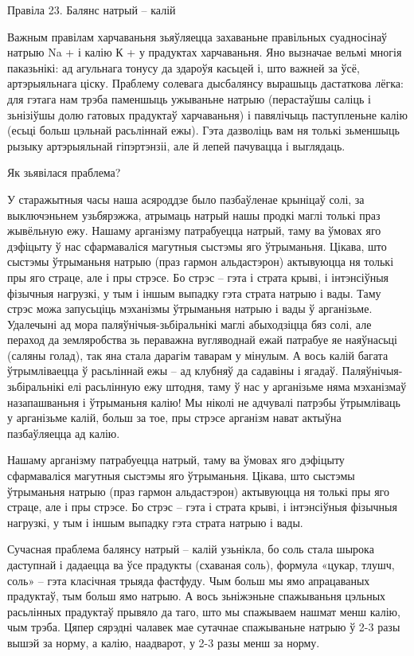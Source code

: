 Правіла 23. Балянс натрый – калій

Важным правілам харчаваньня зьяўляецца захаваньне правільных суадносінаў натрыю Na + і калію К + у прадуктах харчаваньня. Яно вызначае вельмі многія паказьнікі: ад агульнага тонусу да здароўя касьцей і, што важней за ўсё, артэрыяльнага ціску.
Праблему солевага дысбалянсу вырашыць дастаткова лёгка: для гэтага нам трэба паменшыць ужываньне натрыю (перастаўшы саліць і зьнізіўшы долю гатовых прадуктаў харчаваньня) і павялічыць паступленьне калію (есьці больш цэльнай расьліннай ежы). Гэта дазволіць вам ня толькі зьменшыць рызыку артэрыяльнай гіпэртэнзіі, але й лепей пачувацца і выглядаць.

Як зьявілася праблема?

У старажытныя часы наша асяроддзе было пазбаўленае крыніцаў солі, за выключэньнем узьбярэжжа, атрымаць натрый нашы продкі маглі толькі праз жывёльную ежу. Нашаму арганізму патрабуецца натрый, таму ва ўмовах яго дэфіцыту ў нас сфармаваліся магутныя сыстэмы яго ўтрыманьня. Цікава, што сыстэмы ўтрыманьня натрыю (праз гармон альдастэрон) актывуюцца ня толькі пры яго страце, але і пры стрэсе. Бо стрэс – гэта і страта крыві, і інтэнсіўныя фізычныя нагрузкі, у тым і іншым выпадку  гэта страта натрыю і вады. Таму стрэс можа запусьціць мэханізмы ўтрыманьня натрыю і вады ў арганізьме. Удалечыні ад мора паляўнічыя-зьбіральнікі маглі абыходзіцца бяз солі, але пераход да земляробства зь пераважна вугляводнай ежай патрабуе яе наяўнасьці (саляны голад), так яна стала дарагім таварам у мінулым.
А вось калій багата ўтрымліваецца ў расьліннай ежы – ад клубняў да садавіны і ягадаў. Паляўнічыя-зьбіральнікі елі расьлінную ежу штодня, таму ў нас у арганізьме няма мэханізмаў назапашваньня і ўтрыманьня калію! Мы ніколі не адчувалі патрэбы ўтрымліваць у арганізьме калій, больш за тое, пры стрэсе арганізм нават актыўна пазбаўляецца ад калію.

Нашаму арганізму патрабуецца натрый, таму ва ўмовах яго дэфіцыту сфармаваліся магутныя сыстэмы яго ўтрыманьня. Цікава, што сыстэмы ўтрыманьня натрыю (праз гармон альдастэрон) актывуюцца ня толькі пры яго страце, але і пры стрэсе. Бо стрэс – гэта і страта крыві, і інтэнсіўныя фізычныя нагрузкі, у тым і іншым выпадку гэта страта натрыю і вады.

Сучасная праблема балянсу натрый – калій узьнікла, бо соль стала шырока даступнай і дадаецца ва ўсе прадукты (схаваная соль), формула «цукар, тлушч, соль» – гэта класічная трыяда фастфуду. Чым больш мы ямо апрацаваных прадуктаў, тым больш ямо натрыю. А вось зьніжэньне спажываньня цэльных расьлінных прадуктаў прывяло да таго, што мы спажываем нашмат менш калію, чым трэба. Цяпер сярэдні чалавек мае сутачнае спажываньне натрыю ў 2-3 разы вышэй за норму, а калію, наадварот, у 2-3 разы менш за норму.

